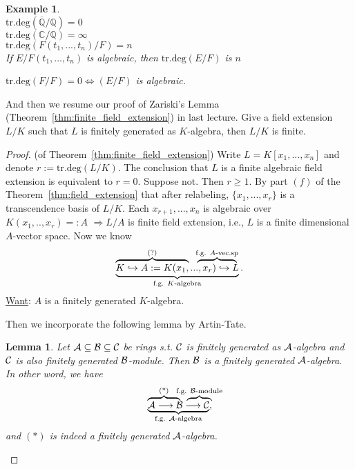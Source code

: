 \documentclass[11pt]{article}
\newtheorem{lemma}[thm]{Lemma}
\newtheorem{ex}[thm]{Example}
\newcommand{\cplx}{\mathbb C}
\newcommand{\ratl}{\mathbb Q}
\newcommand{\cala}{{\cal A}}
\newcommand{\calb}{{\cal B}}
\newcommand{\calc}{{\cal C}}
\newcommand{\Lrta}{\Longrightarrow}
\newcommand{\lrta}{\longrightarrow}
\newcommand{\Llrta}{\Longleftrightarrow}
\newcommand{\inj}{\hookrightarrow}
\begin{document}
\begin{ex}\ \\
$\text{tr.deg}(\overline{\ratl}/{\ratl})=0$\\
$\text{tr.deg}(\cplx/\ratl)=\infty$\\
$\text{tr.deg}(F(t_1,...,t_n)/F)=n$\\
If $E/F(t_1,...,t_n)$ is algebraic, then $\text{tr.deg}(E/F)$ is $n$

$\text{tr.deg}(F/F)=0\Llrta (E/F)$ is algebraic.
\end{ex}

And then we resume our proof of Zariski's Lemma (Theorem~\ref{thm:finite_field_extension}) in last lecture. Give a field extension $L/K$ such that $L$ is finitely generated as $K$-algebra, then $L/K$ is finite.
\begin{proof}(of Theorem~\ref{thm:finite_field_extension})
Write $L=K[ x_1,...,x_n]$ and denote
$r:=\text{tr.deg}(L/K). $ The  conclusion that $L$ is a finite algebraic field extension is equivalent to $ r=0$. Suppose not. Then $r\geq 1$. By part $(f)$ of the Theorem~\ref{thm:field_extension} that after relabeling,
$\{x_1,...,x_r\}$ is a transcendence basis of $L/K$. Each $x_{r+1},...,x_n$ is algebraic over $K(x_1,..,x_r)=:A$ $\Lrta L/A$ is finite field extension, i.e., $L$ is a finite dimensional $A$-vector space. Now we know
\[\underbrace{
      \mathrlap{\overbrace{\phantom{K\inj A:=K(x_1,}}^{\text{(?)}}}
      K\inj A:=K(x_1,..
      \mathrlap{\overbrace{\phantom{...,x_r)\inj  }}^{\text{f.g. $A$-vec.sp}}}
      .,x_r) \inj L
      }_{\text{f.g. $K$-algebra}}.
\]
\underline{Want}: $A$ is a finitely generated $K$-algebra.

Then we incorporate the following lemma by Artin-Tate.
\begin{lemma}\label{lem:Artin_Tate}
Let $\cala\subseteq\calb\subseteq\calc$ be rings s.t. $\calc$ is finitely generated as $\cala$-algebra and $\calc$ is also finitely generated $\calb$-module. Then $\calb$ is a finitely generated $\cala$-algebra. In other word, we have
\[\underbrace{
      \mathrlap{\overbrace{\phantom{\cala \lrta b }}^{\text{(*)}}}
      \cala\lrta 
      \mathrlap{\overbrace{\phantom{\calb\lrta   }}^{\text{f.g. $\calb$-module}}}
       \calb\lrta \calc
      }_{\text{f.g. $\cala$-algebra}},
\]
and $(*)$ is indeed a finitely generated $\cala$-algebra.



\end{lemma}
\end{proof}
\end{document}
